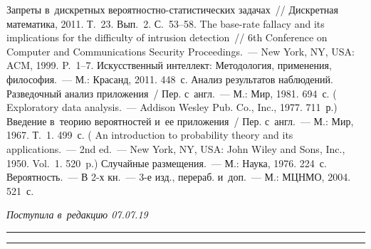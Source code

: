 \begin{multicols}{2}
{{\begin{thebibliography}{99}
 Запреты в~дискретных вероятностно-статистических задачах~// 
Дискретная математика, 2011. Т.~23. Вып.~2. С.~53--58.
 The base-rate fallacy and its implications for the difficulty of intrusion detection~// 
6th Conference on Computer and Communications Security Proceedings.~--- New York, NY, USA: 
ACM, 1999. P.~1--7.
 Искусственный интеллект: Методология, применения, философия.~--- М.: 
Красанд, 2011. 448~с.
 Анализ результатов наблюдений. Разведочный анализ приложения~/ Пер. 
с~англ.~--- М.: Мир, 1981. 694~с. ( Exploratory data analysis.~--- Addison Wesley 
Pub. Co., Inc., 1977. 711~р.)
 Введение в~теорию вероятностей и~ее приложения~/ Пер. с~англ.~--- М.: Мир, 
1967. Т.~1. 499~с. ( An introduction to probability theory and its applications.~--- 2nd 
ed.~--- New York, NY, USA: John Wiley and Sons, Inc., 1950. Vol.~1. 520~p.)
 Случайные размещения.~--- М.: 
Наука, 1976. 224~с. 
 Вероятность.~--- В 2-х кн.~--- 3-е изд., перераб. и~доп.~--- М.: МЦНМО, 
2004. 521~с. 
 \end{thebibliography}

 }
 }

\end{multicols}

\vspace*{-9pt}

\hfill{\small\textit{Поступила в~редакцию 07.07.19}}

\vspace*{6pt}




\hrule

\vspace*{2pt}

\hrule

\vspace*{-3pt}

\def\tit{METHODS OF IDENTIFICATION OF~``WEAK'' SIGNS 
OF~VIOLATIONS OF~INFORMATION SECURITY}


\def\titkol{Methods of identification of~``weak'' signs 
of~violations of~information security}

\def\aut{A.\,A.~Grusho, N.\,A.~Grusho, and E.\,E.~Timonina}

